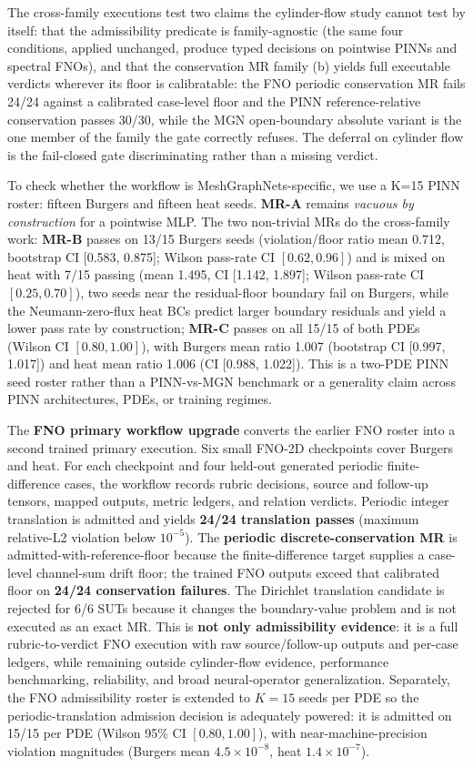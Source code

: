\documentclass[preprint,12pt]{elsarticle}
\begin{document}
The cross-family executions test two claims the cylinder-flow study cannot test by itself: that the admissibility predicate is family-agnostic (the same four conditions, applied unchanged, produce typed decisions on pointwise PINNs and spectral FNOs), and that the conservation MR family (b) yields full executable verdicts wherever its floor is calibratable: the FNO periodic conservation MR fails 24/24 against a calibrated case-level floor and the PINN reference-relative conservation passes 30/30, while the MGN open-boundary absolute variant is the one member of the family the gate correctly refuses. The deferral on cylinder flow is the fail-closed gate discriminating rather than a missing verdict.

To check whether the workflow is MeshGraphNets-specific, we use a K=15 PINN roster: fifteen Burgers and fifteen heat seeds. \textbf{MR-A} remains \emph{vacuous by construction} for a pointwise MLP. The two non-trivial MRs do the cross-family work: \textbf{MR-B} passes on 13/15 Burgers seeds (violation/floor ratio mean 0.712, bootstrap CI [0.583, 0.875]; Wilson pass-rate CI $[0.62, 0.96]$) and is mixed on heat with 7/15 passing (mean 1.495, CI [1.142, 1.897]; Wilson pass-rate CI $[0.25, 0.70]$), two seeds near the residual-floor boundary fail on Burgers, while the Neumann-zero-flux heat BCs predict larger boundary residuals and yield a lower pass rate by construction; \textbf{MR-C} passes on all 15/15 of both PDEs (Wilson CI $[0.80, 1.00]$), with Burgers mean ratio 1.007 (bootstrap CI [0.997, 1.017]) and heat mean ratio 1.006 (CI [0.988, 1.022]). This is a two-PDE PINN seed roster rather than a PINN-vs-MGN benchmark or a generality claim across PINN architectures, PDEs, or training regimes.


The \textbf{FNO primary workflow upgrade} converts the earlier FNO roster into a second trained primary execution. Six small FNO-2D checkpoints cover Burgers and heat. For each checkpoint and four held-out generated periodic finite-difference cases, the workflow records rubric decisions, source and follow-up tensors, mapped outputs, metric ledgers, and relation verdicts. Periodic integer translation is admitted and yields \textbf{24/24 translation passes} (maximum relative-L2 violation below $10^{-5}$). The \textbf{periodic discrete-conservation MR} is admitted-with-reference-floor because the finite-difference target supplies a case-level channel-sum drift floor; the trained FNO outputs exceed that calibrated floor on \textbf{24/24 conservation failures}. The Dirichlet translation candidate is rejected for 6/6 SUTs because it changes the boundary-value problem and is not executed as an exact MR. This is \textbf{not only admissibility evidence}: it is a full rubric-to-verdict FNO execution with raw source/follow-up outputs and per-case ledgers, while remaining outside cylinder-flow evidence, performance benchmarking, reliability, and broad neural-operator generalization. Separately, the FNO admissibility roster is extended to $K=15$ seeds per PDE so the periodic-translation admission decision is adequately powered: it is admitted on 15/15 per PDE (Wilson 95\% CI $[0.80, 1.00]$), with near-machine-precision violation magnitudes (Burgers mean $4.5\times10^{-8}$, heat $1.4\times10^{-7}$).



\end{document}

